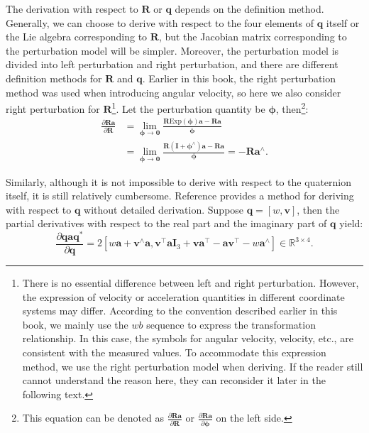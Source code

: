 The derivation with respect to $\mathbf{R}$ or $\mathbf{q}$ depends on the definition method. Generally, we can choose to derive with respect to the four elements of $\mathbf{q}$ itself or the Lie algebra corresponding to $\mathbf{R}$, but the Jacobian matrix corresponding to the perturbation model will be simpler. Moreover, the perturbation model is divided into left perturbation and right perturbation, and there are different definition methods for $\mathbf{R}$ and $\mathbf{q}$. Earlier in this book, the right perturbation method was used when introducing angular velocity, so here we also consider right perturbation for $\mathbf{R}$\footnote{There is no essential difference between left and right perturbation. However, the expression of velocity or acceleration quantities in different coordinate systems may differ. According to the convention described earlier in this book, we mainly use the $wb$ sequence to express the transformation relationship. In this case, the symbols for angular velocity, velocity, etc., are consistent with the measured values. To accommodate this expression method, we use the right perturbation model when deriving. If the reader still cannot understand the reason here, they can reconsider it later in the following text.}. Let the perturbation quantity be $\boldsymbol{\phi}$, then\footnote{This equation can be denoted as $\frac{{\partial \mathbf{R} \mathbf{a}}}{{\partial \mathbf{R} }}$ or $\frac{{\partial \mathbf{R} \mathbf{a}}}{{\partial \boldsymbol{\phi} }}$ on the left side.}:
\begin{equation}\label{key}
\begin{aligned}
	\frac{{\partial \mathbf{R} \mathbf{a}}}{{\partial \mathbf{R} }} &= \lim_{\boldsymbol{\phi} \to \mathbf{0}} \frac{{\mathbf{R} \mathrm{Exp} \left( \boldsymbol{\phi} \right) 
			\mathbf{a} - \mathbf{R} \mathbf{a} }}{\boldsymbol{\phi} }\\
	&= \lim_{\boldsymbol{\phi} \to \mathbf{0}} \frac{{\mathbf{R} \left( \mathbf{I} + 
			{\boldsymbol{\phi}^\wedge} \right) \mathbf{a} - \mathbf{R} \mathbf{a}}}{\boldsymbol{\phi} } = - 
	\mathbf{R} {\mathbf{a}^\wedge}.
\end{aligned}
\end{equation}

Similarly, although it is not impossible to derive with respect to the quaternion itself, it is still relatively cumbersome. Reference \cite{Sola2017} provides a method for deriving with respect to $\mathbf{q}$ without detailed derivation. Suppose $\mathbf{q} = [w, \mathbf{v}]$, then the partial derivatives with respect to the real part and the imaginary part of $\mathbf{q}$ yield:
\begin{equation}\label{key}
	\frac{\partial \mathbf{q} \mathbf{a} \mathbf{q}^*}{\partial \mathbf{q}} = 2 \left[w \mathbf{a} + \mathbf{v}^\wedge \mathbf{a}, 
	\mathbf{v}^\top \mathbf{a} \mathbf{I}_3 + \mathbf{v} \mathbf{a}^\top - \mathbf{a} \mathbf{v}^\top - 
	w\mathbf{a}^\wedge \right] \in \mathbb{R}^{3\times 4}.
\end{equation}

